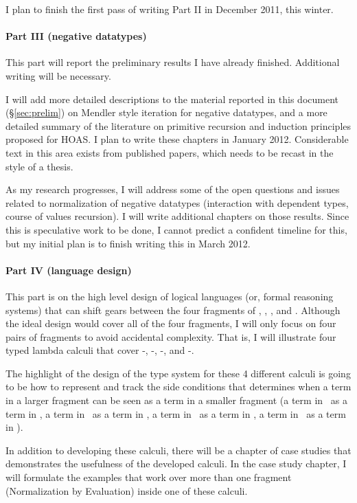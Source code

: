 I plan to finish the first pass of writing Part II in December 2011,
this winter.

\paragraph{Part III (negative datatypes)}
This part will report the preliminary results I have already finished.
Additional writing will be necessary.
 
I will add more detailed descriptions to the material reported in this document
(\S\ref{sec:prelim}) on Mendler style iteration for negative datatypes,
and a more detailed summary of the literature on primitive recursion and
induction principles proposed for HOAS. I plan to write these chapters
in January 2012. Considerable text in this area exists from published papers,
which needs to be recast in the style of a thesis.

As my research progresses, I will address some of the open questions and
issues related to normalization of negative datatypes
(\eg interaction with dependent types, course of values recursion).
I will write additional chapters on those results.
Since this is speculative work to be done, I cannot predict a confident timeline
for this, but my initial plan is to finish writing this in March 2012.

\paragraph{Part IV (language design)}
This part is on the high level design of logical languages
(or, formal reasoning systems) that can shift gears between
the four fragments of \IND, \INDbot, \REC, and \RECbot.
Although the ideal design would cover all of the four fragments,
I will only focus on four pairs of fragments to avoid accidental complexity.
That is, I will illustrate four typed lambda calculi that cover
\IND-\INDbot, \IND-\REC, \REC-\RECbot, and \INDbot-\RECbot.

The highlight of the design of the type system for these 4 different calculi
is going to be how to represent and track the side conditions that determines
when a term in a larger fragment can be seen as a term in a smaller fragment
(\ie a term in \INDbot\ as a term in \IND, a term in \REC\ as a term in \IND,
a term in \RECbot\ as a term in \REC, a term in \RECbot\ as a term in \INDbot).

In addition to developing these calculi, there will be a chapter of case studies
that demonstrates the usefulness of the developed calculi. In the case study
chapter, I will formulate the examples that work over more than one fragment
(\eg Normalization by Evaluation) inside one of these calculi.

